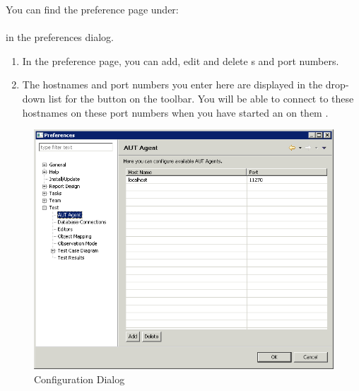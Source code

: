 
\label{TasksPrefsAgent}

You can find the \gdagent{} preference page under:\\
\\
in the preferences dialog.


\begin{enumerate}
\item In the \gdagent{} preference page, you can add, edit and delete \gdagent{}s and port numbers. 
\item The hostnames and port numbers you enter here are displayed in the drop-down list for the  button on the toolbar. You will be able to connect to these hostnames on these port numbers when you have started an \gdagent{} on them .
\end{enumerate}


\begin{figure}[p]
\begin{center}
\includegraphics[width=12.5cm]{Tasks/Preferences/PS/serverconfig}
\caption{\gdagent Configuration Dialog}
\label{serverconfig}
\end{center}
\end{figure}







